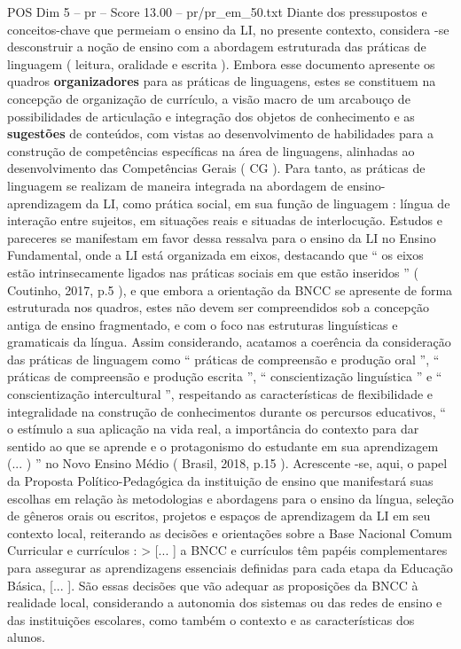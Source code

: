\begin{textsample}{POS Dim 5 – pr – Score 13.00 – pr/pr\_em\_50.txt}
Diante dos pressupostos e conceitos-chave que permeiam o ensino da LI, no presente contexto, considera -se desconstruir a noção de ensino com a abordagem estruturada das práticas de linguagem ( leitura, oralidade e escrita ).
Embora esse documento apresente os quadros \textbf{organizadores} para as práticas de linguagens, estes se constituem na concepção de organização de currículo, a visão macro de um arcabouço de possibilidades de articulação e integração dos objetos de conhecimento e as \textbf{sugestões} de conteúdos, com vistas ao desenvolvimento de habilidades para a construção de competências específicas na área de linguagens, alinhadas ao desenvolvimento das Competências Gerais ( CG ).
Para tanto, as práticas de linguagem se realizam de maneira integrada na abordagem de ensino-aprendizagem da LI, como prática social, em sua função de linguagem : língua de interação entre sujeitos, em situações reais e situadas de interlocução.
Estudos e pareceres se manifestam em favor dessa ressalva para o ensino da LI no Ensino Fundamental, onde a LI está organizada em eixos, destacando que “ os eixos estão intrinsecamente ligados nas práticas sociais em que estão inseridos ” ( Coutinho, 2017, p.5 ), e que embora a orientação da BNCC se apresente de forma estruturada nos quadros, estes não devem ser compreendidos sob a concepção antiga de ensino fragmentado, e com o foco nas estruturas linguísticas e gramaticais da língua.
Assim considerando, acatamos a coerência da consideração das práticas de linguagem como “ práticas de compreensão e produção oral ”, “ práticas de compreensão e produção escrita ”, “ conscientização linguística ” e “ conscientização intercultural ”, respeitando as características de flexibilidade e integralidade na construção de conhecimentos durante os percursos educativos, “ o estímulo a sua aplicação na vida real, a importância do contexto para dar sentido ao que se aprende e o protagonismo do estudante em sua aprendizagem (... ) ” no Novo Ensino Médio ( Brasil, 2018, p.15 ).
Acrescente -se, aqui, o papel da Proposta Político-Pedagógica da instituição de ensino que manifestará suas escolhas em relação às metodologias e abordagens para o ensino da língua, seleção de gêneros orais ou escritos, projetos e espaços de aprendizagem da LI em seu contexto local, reiterando as decisões e orientações sobre a Base Nacional Comum Curricular e currículos : > [... ] a BNCC e currículos têm papéis complementares para assegurar as aprendizagens essenciais definidas para cada etapa da Educação Básica, [... ].
São essas decisões que vão adequar as proposições da BNCC à realidade local, considerando a autonomia dos sistemas ou das redes de ensino e das instituições escolares, como também o contexto e as características dos alunos.

\end{textsample}
